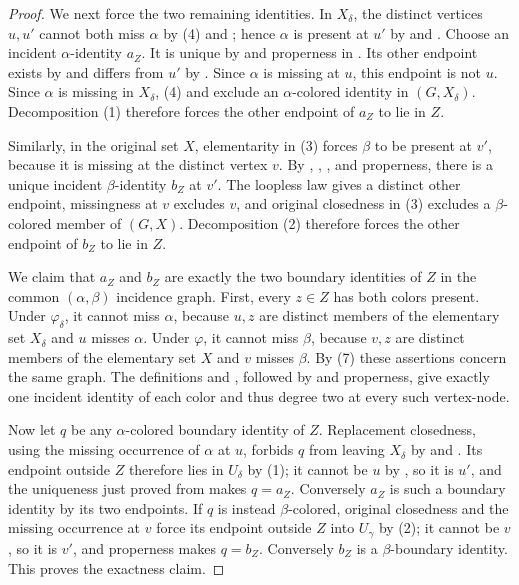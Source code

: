 \begin{proof}
We next force the two remaining identities.  In $X_\delta$, the distinct
vertices $u,u'$ cannot both miss $\alpha$ by (4) and
; hence $\alpha$ is present at $u'$ by
 and .  Choose an incident
$\alpha$-identity $a_Z$.  It is unique by
 and properness in
.  Its other endpoint exists by
 and differs from $u'$ by
.  Since $\alpha$ is missing at $u$, this
endpoint is not $u$.  Since $\alpha$ is missing in $X_\delta$, (4) and
 exclude an $\alpha$-colored identity in
$(G,X_\delta)$.  Decomposition (1) therefore forces
the other endpoint of $a_Z$ to lie in $Z$.

Similarly, in the original set $X$, elementarity in (3) forces $\beta$ to
be present at $v'$, because it is missing at the distinct vertex $v$.
By , ,
, and properness, there is a unique incident
$\beta$-identity $b_Z$ at $v'$.  The loopless law gives a distinct other
endpoint, missingness at $v$ excludes $v$, and original closedness in (3)
excludes a $\beta$-colored member of
$(G,X)$.  Decomposition (2) therefore forces the
other endpoint of $b_Z$ to lie in $Z$.

We claim that $a_Z$ and $b_Z$ are exactly the two boundary identities of
$Z$ in the common $(\alpha,\beta)$ incidence graph.  First, every
$z\in Z$ has both colors present.  Under $\varphi_\delta$, it cannot miss
$\alpha$, because $u,z$ are distinct members of the elementary set
$X_\delta$ and $u$ misses $\alpha$.  Under $\varphi$, it cannot miss
$\beta$, because $v,z$ are distinct members of the elementary set $X$ and
$v$ misses $\beta$.  By (7) these assertions concern the same graph.  The
definitions  and , followed
by  and properness, give exactly one incident
identity of each color and thus degree two at every such vertex-node.

Now let $q$ be any $\alpha$-colored boundary identity of $Z$.  Replacement
closedness, using the missing occurrence of $\alpha$ at $u$, forbids $q$
from leaving $X_\delta$ by
 and .  Its endpoint
outside $Z$ therefore lies in $U_\delta$ by (1); it cannot be $u$ by
, so it is $u'$, and the uniqueness just proved from
 makes $q=a_Z$.  Conversely $a_Z$ is such a
boundary identity by its two endpoints.  If $q$ is instead
$\beta$-colored, original closedness and the missing occurrence at $v$
force its endpoint outside $Z$ into $U_\gamma$ by (2); it cannot be $v$,
so it is $v'$, and properness makes $q=b_Z$.  Conversely $b_Z$ is a
$\beta$-boundary identity.  This proves the exactness claim.


\end{proof}
